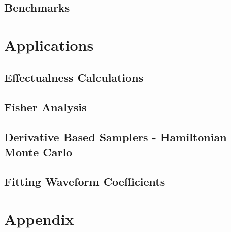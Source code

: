 \documentclass[twocolumn]{aastex631}
\begin{document}
\subsection{Benchmarks}
\label{subsec:benchmarks}

\section{Applications}
\label{sec:applications}

\subsection{Effectualness Calculations}
\label{sec:effectualness}

\subsection{Fisher Analysis}
\label{subsec:fisher}

\subsection{Derivative Based Samplers - Hamiltonian Monte Carlo}
\label{subsec:hmc}

\subsection{Fitting Waveform Coefficients}
\label{subsec:hmc}




\section{Appendix}
\label{sec:appendix}
\end{document}
